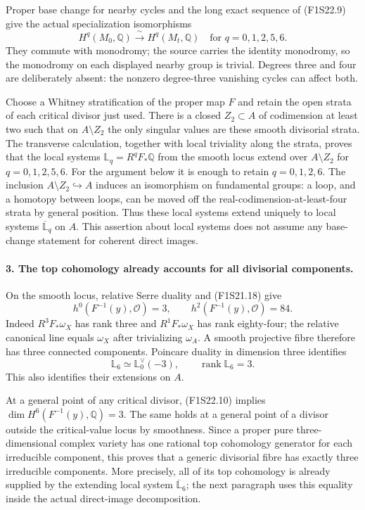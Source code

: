 Proper base change for nearby cycles and the long exact
sequence of (F1S22.9) give the actual specialization
isomorphisms
\[
 H^q(M_0,\mathbb Q)\xrightarrow{\ \sim\ }H^q(M_t,\mathbb Q)
               \quad\text{for }q=0,1,2,5,6.
 \tag{F1S22.10}
\]
They commute with monodromy; the source carries the identity
monodromy, so the monodromy on each displayed nearby group
is trivial. Degrees three and four are deliberately absent:
the nonzero degree-three vanishing cycles can affect both.

Choose a Whitney stratification of the proper map $F$ and
retain the open strata of each critical divisor just used.
There is a closed $Z_2\subset A$ of codimension at least two
such that on $A\setminus Z_2$ the only singular values are
these smooth divisorial strata. The transverse calculation,
together with local triviality along the strata, proves that
the local systems $\mathbb L_q=R^qF_*\mathbb Q$ from the
smooth locus extend over $A\setminus Z_2$ for $q=0,1,2,5,6$.
For the argument below it is enough to retain $q=0,1,2,6$.
The inclusion $A\setminus Z_2\hookrightarrow A$ induces an
isomorphism on fundamental groups: a loop, and a homotopy
between loops, can be moved off the real-codimension-at-least-four
strata by general position. Thus these local systems extend
uniquely to local systems $\overline{\mathbb L}_q$ on $A$.
This assertion about local systems does not assume any
base-change statement for coherent direct images.

\paragraph{3. The top cohomology already accounts for all divisorial components.}
On the smooth locus, relative Serre duality and (F1S21.18)
give
\[
 h^0(F^{-1}(y),\mathcal O)=3,\qquad
 h^2(F^{-1}(y),\mathcal O)=84.
 \tag{F1S22.11}
\]
Indeed $R^3F_*\omega_X$ has rank three and
$R^1F_*\omega_X$ has rank eighty-four; the relative
canonical line equals $\omega_X$ after trivializing
$\omega_A$. A smooth projective fibre therefore has three
connected components. Poincare duality in dimension three
identifies
\[
        \mathbb L_6\simeq\mathbb L_0^\vee(-3),
                  \qquad\operatorname{rank}\mathbb L_6=3.
 \tag{F1S22.12}
\]
This also identifies their extensions on $A$.

At a general point of any critical divisor, (F1S22.10)
implies $\dim H^6(F^{-1}(y),\mathbb Q)=3$.
The same holds at a general point of a divisor outside the
critical-value locus by smoothness. Since a proper pure
three-dimensional complex variety has one rational top
cohomology generator for each irreducible component, this
proves that a generic divisorial fibre has exactly three
irreducible components. More precisely, all of its top
cohomology is already supplied by the extending local system
$\overline{\mathbb L}_6$; the next paragraph uses this
equality inside the actual direct-image decomposition.

